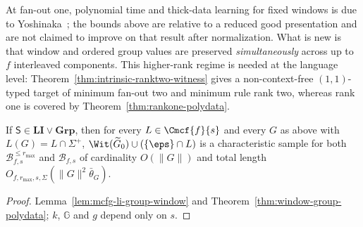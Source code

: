 At fan-out one, polynomial time and thick-data learning for fixed windows is due
to Yoshinaka~\cite[Theorem~1]{Yoshinaka2008}; the bounds above are relative to a
reduced good presentation and are not claimed to improve on that result after
normalization.  What is new is that window and ordered group values are preserved
\emph{simultaneously} across up to $f$ interleaved components.  This higher-rank
regime is needed at the language level: Theorem~\ref{thm:intrinsic-ranktwo-witness}
gives a non-context-free $(1,1)$-typed target of minimum fan-out two and minimum
rule rank two, whereas rank one is covered by Theorem~\ref{thm:rankone-polydata}.

\begin{corollary}
\label{cor:mcfg-li-group-polydata}
If $\mathsf S\in\mathbf{LI}\vee\mathbf{Grp}$, then for every $L\in\Cmcf{f}{s}$ and
every $G$ as above with $L(G)=L\cap\Sigma^+$, $\Wit(\widetilde G_0)\cup(\{\eps\}\cap L)$
is a characteristic sample for both $\mathcal B^{\le r_{\max}}_{f,s}$ and
$\mathcal B_{f,s}$ of cardinality
$O(\|G\|)$ and total length $O_{f,r_{\max},s,\Sigma}(\|G\|^2\bar\theta_G)$.
\end{corollary}

\begin{proof}
Lemma~\ref{lem:mcfg-li-group-window} and
Theorem~\ref{thm:window-group-polydata}; $k$, ${\mathbb G}$ and $g$ depend only on $s$.
\end{proof}

